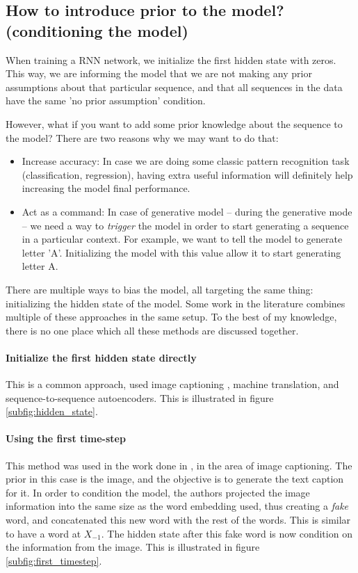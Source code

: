 \subsection{How to introduce prior to the model? (conditioning the model)}
\par When training a RNN network, we initialize the first hidden state with zeros. This way, we are informing the model that we are not making any prior assumptions about that particular sequence, and that all sequences in the data have the same 'no prior assumption' condition.

\par However, what if you want to add some prior knowledge about the sequence to the model? There are two reasons why we may want to do that:
\begin{itemize}
    \item Increase accuracy: In case we are doing some classic pattern recognition task (classification, regression), having extra useful information will definitely help increasing the model final performance.
    \item Act as a command: In case of generative model -- during the generative mode -- we need a way to \textit{trigger} the model in order to start generating a sequence in a particular context. For example, we want to tell the model to generate letter 'A'.  Initializing the model with this value allow it to start generating letter A.
\end{itemize}

There are multiple ways to bias the model, all targeting the same thing: initializing the hidden state of the model. Some work in the literature combines multiple of these approaches in the same setup. To the best of my knowledge, there is no one place which all these methods are discussed together.

\paragraph{Initialize the first hidden state directly} This is a common approach, used image captioning \citep{karpathy2015deep}, machine translation, and sequence-to-sequence autoencoders. This is illustrated in figure \ref{subfig:hidden_state}.

\paragraph{Using the first time-step} This method was used in the work done in \citep{vinyals2015show}, in the area of image captioning. The prior in this case is the image, and the objective is to generate the text caption for it. In order to condition the model, the authors projected the image information into the same size as the word embedding used, thus creating a \textit{fake} word, and concatenated this new word with the rest of the words. This is similar to have a word at $X_{-1}$. The hidden state after this fake word is now condition on the information from the image. This is illustrated in figure \ref{subfig:first_timestep}.

